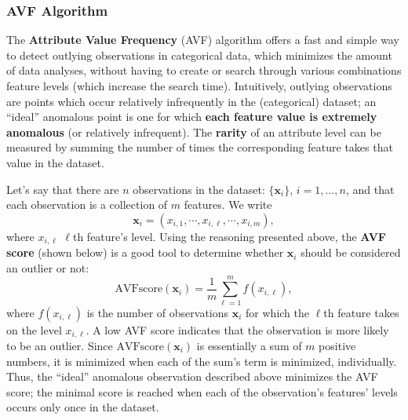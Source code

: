 \subsubsection*{AVF Algorithm}
The \textbf{Attribute Value Frequency} (AVF) algorithm offers a fast and simple way to detect outlying observations in categorical data, which minimizes the amount of data analyses, without having to create or search through various combinations feature levels (which increase the search time).  \newline\newline Intuitively, outlying observations are points which occur relatively infrequently in the (categorical) dataset;  an ``ideal'' anomalous point is one for which  \textbf{each feature value is extremely anomalous} (or relatively infrequent). 
\newline\newline The \textbf{rarity} of an attribute level can be measured by summing the number of times the corresponding feature takes that value in the dataset. 

Let's say that there are $n$ observations in the dataset: $\{\mathbf{x}_i\}$, $i = 1, \ldots, n$, and that each observation is a collection of $m$ features. We write $$\mathbf{x}_{i} = (x_{i,1}, \cdots , x_{i,\ell}, \cdots, x_{i,m}),$$ where  $x_{i,\ell}$ $\ell$th feature's level. Using the reasoning presented above, the \textbf{AVF score} (shown below) is a good tool to determine whether  $\textbf{x}_i$ should be considered an outlier or not:
$$\text{AVFscore}(\mathbf{x}_i) = \frac{1}{m} \sum_{\ell=1}^{m}f(x_{i,\ell}),$$
where $f(x_{i,\ell})$ is the number of observations $\mathbf{x}_i$ for which the  $\ell$th feature takes on the level ${x}_{i,\ell}$. A low AVF score indicates that the observation is more likely to be an outlier. 
\newline\newline Since $\text{AVFscore}(\mathbf{x}_i) $ is essentially a sum of $m$ positive numbers, it is minimized when each of the sum's term is minimized, individually. Thus, the ``ideal'' anomalous observation described above minimizes the AVF score; the minimal score is reached when each of the observation's features' levels occurs only once in the dataset.

